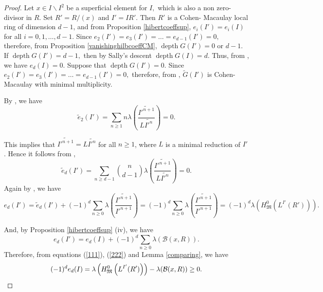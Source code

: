 \documentclass[reqno,a4paper,dvipsnames]{amsart}
\newcommand{\M}{\mathfrak{M}}
\newcommand{\depth}{\operatorname{depth}}
\theoremstyle{definition}
\begin{document}
\begin{proof}
    Let $x \in I \backslash I^{2}$ be a superficial element 
    for $I,$ which is also a non zero-divisor in $R.$  Set $R'=R/(x)$ and $I'=IR'.$ Then $R'$ is a Cohen-
    Macaulay local ring of dimension $d-1$, and from  Proposition \ref{hibertcoeffsup},
    $e_{i}(I')=e_{i}(I)$ for all $i=0,1,\ldots, d-1.$ 
    Since $e_{2}(I')=e_{3}(I')=\ldots=e_{d-1}(I')=0,$ therefore, 
    from Proposition \ref{vanishinghilbcoeffCM}, $\depth G(I')=0$ or $d-1.$ 
     If $\depth G(I')=d-1,$ then by Sally's descent $\depth G(I)=d.$ 
    Thus, from \cite[Corollary 2(ii)]{marley}, we have $e_{d}(I) = 0.$
Suppose that $\depth G(I')=0.$ Since 
    $e_{2}(I')=e_{3}(I')=\ldots=e_{d-1}(I')=0,$ therefore, from \cite[Theorem 6.2]{tjp2}, $\widetilde{G}(I')$ is Cohen-Macaulay with minimal multiplicity.
   
 By \cite [Theorem 2.5]{rv}, we have
\begin{equation*}
    \widetilde{e}_{2}(I')
         =\displaystyle \sum_{n \geq 1}  n\lambda \left(\frac{ \widetilde{I'^{n+1} }}{L\widetilde{I'^{n}}}\right)=0.
\end{equation*}

    This implies that $\widetilde{I'^{n+1}} = L \widetilde{I'^{n}}$ for all $n \geq 1$, where $L$ is a minimal reduction of $I'$. Hence it follows from \cite [Theorem 2.5]{rv}, 
\begin{equation*}
    \widetilde{e}_{d}(I')
         =\displaystyle \sum_{n \geq d-1}  \binom{n}{d-1}\lambda \left(\frac{ \widetilde{I'^{n+1} }}{L\widetilde{I'^{n}}}\right)=0.
\end{equation*}
    Again by \cite[1.5(b)]{tjp}, we have
 \begin{equation} \label{111}
        e_{d}(I')
        =\widetilde{e}_{d}(I')+(-1)^{d}\displaystyle
            \sum_{n \geq 0}\lambda\left(\frac{\widetilde{I'^{n+1}}}{I'^{n+1}}\right)
        =(-1)^{d}\displaystyle\sum_{n \geq 0}\lambda\left(\frac{\widetilde{I'^{n+1}}}{I'^{n+1}}\right)=(-1)^{d}\lambda\left(H^{0}_{\M}\left(L^{I'}(R')\right)\right).
    \end{equation}
 

   And, by Proposition \ref{hibertcoeffsup} (iv), we have 
    \begin{equation} \label{222}
        e_{d}(I')
        =e_{d}(I)+(-1)^{d}\displaystyle\sum_{n \geq 0}\lambda(\mathcal{B}(x,R)). 
    \end{equation}
    Therefore, from equations (\ref{111}), (\ref{222}) and Lemma \ref{comparing}, 
    we have \[(-1)^{d}e_{d}(I)=\lambda\left(H^{0}_{\M}\left(L^{I'}(R')\right)\right)- \lambda(\mathcal{B}(x,R)) \geq 0.\qedhere\] 
\end{proof}
\end{document}
